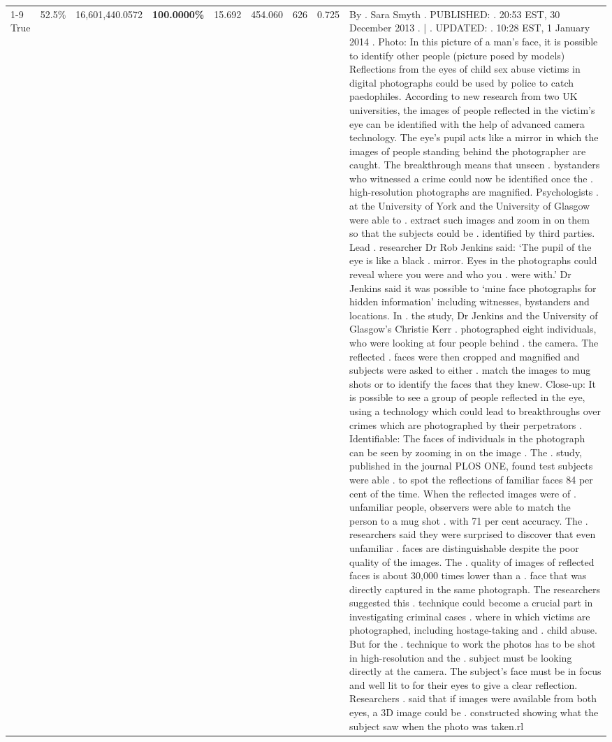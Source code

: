 \begin{table}[H]
\begin{tabular}{lllrlllll}
\cline{1-9}
True & 52.5\% & 16,601,440.0572 & \bfseries \color{red} 100.0000\% & 15.692 & 454.060 & 626 & 0.725 & By . Sara Smyth . PUBLISHED: . 20:53 EST, 30 December 2013 . | . UPDATED: . 10:28 EST, 1 January 2014 . Photo: In this picture of a man's face, it is possible to identify other people (picture posed by models) Reflections from the eyes of child sex abuse victims in digital photographs could be used by police to catch paedophiles. According to new research from two UK universities, the images of people reflected in the victim's eye can be identified with the help of advanced camera technology. The eye's pupil acts like a mirror in which the images of people standing behind the photographer are caught. The breakthrough means that unseen . bystanders who witnessed a crime could now be identified once the . high-resolution photographs are magnified. Psychologists . at the University of York and the University of Glasgow were able to . extract such images and zoom in on them so that the subjects could be . identified by third parties. Lead . researcher Dr Rob Jenkins said: ‘The pupil of the eye is like a black . mirror. Eyes in the photographs could reveal where you were and who you . were with.' Dr Jenkins said it was possible to ‘mine face photographs for hidden information' including witnesses, bystanders and locations. In . the study, Dr Jenkins and the University of Glasgow's Christie Kerr . photographed eight individuals, who were looking at four people behind . the camera. The reflected . faces were then cropped and magnified and subjects were asked to either . match the images to mug shots or to identify the faces that they knew. Close-up: It is possible to see a group of people reflected in the eye, using a technology which could lead to breakthroughs over crimes which are photographed by their perpetrators . Identifiable: The faces of individuals in the photograph can be seen by zooming in on the image . The . study, published in the journal PLOS ONE, found test subjects were able . to spot the reflections of familiar faces 84 per cent of the time. When the reflected images were of . unfamiliar people, observers were able to match the person to a mug shot . with 71 per cent accuracy. The . researchers said they were surprised to discover that even unfamiliar . faces are distinguishable despite the poor quality of the images. The . quality of images of reflected faces is about 30,000 times lower than a . face that was directly captured in the same photograph. The researchers suggested this . technique could become a crucial part in investigating criminal cases . where in which victims are photographed, including hostage-taking and . child abuse. But for the . technique to work the photos has to be shot in high-resolution and the . subject must be looking directly at the camera. The subject's face must be in focus and well lit to for their eyes to give a clear reflection. Researchers . said that if images were available from both eyes, a 3D image could be . constructed showing what the subject saw when the photo was taken.rl \\

\end{tabular}
\end{table}
